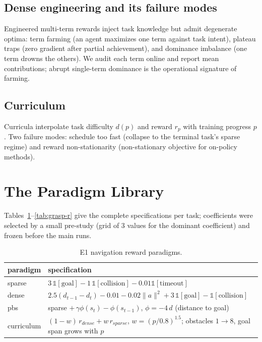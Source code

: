 \documentclass[journal,twoside]{IEEEtran}
\begin{document}
\subsection{Dense engineering and its failure modes}
Engineered multi-term rewards inject task knowledge but admit degenerate
optima: term farming (an agent maximizes one term against task intent),
plateau traps (zero gradient after partial achievement), and
dominance imbalance (one term drowns the others). We audit each term
online and report mean contributions; abrupt single-term dominance is the
operational signature of farming.

\subsection{Curriculum}
Curricula interpolate task difficulty $d(p)$ and reward $r_p$ with
training progress $p$. Two failure modes: schedule too fast (collapse to
the terminal task's sparse regime) and reward non-stationarity
(non-stationary objective for on-policy methods).

\section{The Paradigm Library}
\label{sec:library}
Tables~\ref{tab:nav-r}--\ref{tab:grasp-r} give the complete specifications
per task; coefficients were selected by a small pre-study (grid of 3 values
for the dominant coefficient) and frozen before the main runs.

\begin{table}[t]
\centering
\caption{E1 navigation reward paradigms.}
\label{tab:nav-r}
\begin{tabular}{lp{5.4cm}}
\toprule
paradigm & specification \\
\midrule
sparse & $3\,\mathbb 1[\text{goal}]-1\,\mathbb 1[\text{collision}]
-0.01\mathbb 1[\text{timeout}]$ \\
dense & $2.5(d_{t-1}-d_t)-0.01-0.02\|a\|^2+3\,\mathbb 1[\text{goal}]
-\mathbb 1[\text{collision}]$ \\
pbs & sparse $+\,\gamma\phi(s_t)-\phi(s_{t-1})$,
$\phi=-4\,d$ (distance to goal) \\
curriculum & $(1-w)\,r_{dense}+w\,r_{sparse}$,
$w=(p/0.8)^{1.5}$; obstacles $1{\to}8$, goal span grows with $p$ \\
\bottomrule
\end{tabular}
\end{table}
\end{document}
